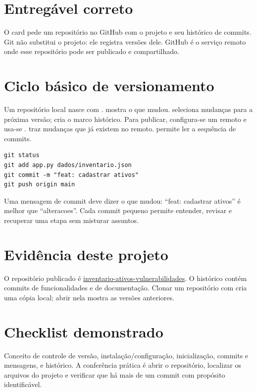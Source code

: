 \documentclass[11pt,a4paper]{article}
\begin{document}
\section*{Entregável correto}
O card pede um repositório no GitHub com o projeto e seu histórico de commits. Git não substitui o projeto: ele registra versões dele. GitHub é o serviço remoto onde esse repositório pode ser publicado e compartilhado.
\section*{Ciclo básico de versionamento}
Um repositório local nasce com .  mostra o que mudou.  seleciona mudanças para a próxima versão;  cria o marco histórico. Para publicar, configura-se um remoto e usa-se .  traz mudanças que já existem no remoto.  permite ler a sequência de commits.
\begin{lstlisting}
git status
git add app.py dados/inventario.json
git commit -m "feat: cadastrar ativos"
git push origin main
\end{lstlisting}
Uma mensagem de commit deve dizer o que mudou: ``feat: cadastrar ativos'' é melhor que ``alteracoes''. Cada commit pequeno permite entender, revisar e recuperar uma etapa sem misturar assuntos.
\section*{Evidência deste projeto}
O repositório publicado é \href{https://github.com/matheus-moreli/inventario-ativos-vulnerabilidades}{inventario-ativos-vulnerabilidades}. O histórico contém commits de funcionalidades e de documentação. Clonar um repositório com  cria uma cópia local; abrir  nela mostra as versões anteriores.
\section*{Checklist demonstrado}
Conceito de controle de versão, instalação/configuração, inicialização, commits e mensagens,  e histórico. A conferência prática é abrir o repositório, localizar os arquivos do projeto e verificar que há mais de um commit com propósito identificável.
\end{document}
